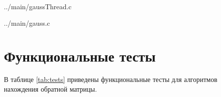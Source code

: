 \noindent
\begin{lstinputlisting}[
	caption={Реализация параллельного алгоритма метода Гаусса-Жордана.},
	label={lst:parallgauss},
	linerange={8-66}
]{../main/gaussThread.c}
\end{lstinputlisting}

\noindent
\begin{minipage}{\linewidth}
\begin{lstinputlisting}[
	caption={Реализация алгоритмов вспомогательных функций.},
	label={lst:vspom},
	linerange={7-23}
]{../main/gauss.c}
\end{lstinputlisting}
\end{minipage}

\clearpage
\section{Функциональные тесты}

В таблице \ref{tab:tests} приведены функциональные тесты для алгоритмов
нахождения обратной матрицы.

